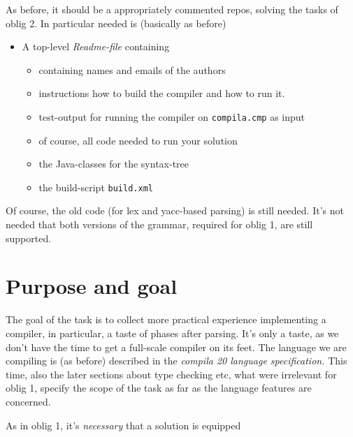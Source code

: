 \documentclass[11pt,freeform]{handout}[2014/08/13]
\begin{document}
As before, it should be a appropriately commented repos, solving the tasks
of oblig 2. In particular needed is (basically as before)


\begin{itemize}
\item A top-level \emph{Readme-file} containing
  \begin{itemize}
  \item  containing names and emails of the authors
  \item instructions how to build the compiler and how to run it.
  \item test-output for running the compiler on \texttt{compila.cmp} as
    input
  \item of course, all code needed to run your solution 
    \item the Java-classes for the syntax-tree
    \item the build-script \texttt{build.xml}
    \end{itemize}
  \end{itemize}

Of course, the old code (for lex and yacc-based parsing) is still
needed. It's not needed that both versions of the grammar, required for
oblig 1, are still supported.



\section{Purpose and goal}
\label{sec:x}

The goal of the task is to collect more practical experience implementing a
compiler, in particular, a taste of phases after parsing. It's only a
taste, as we don't have the time to get a full-scale compiler on its
feet. The language we are compiling is (as before) described in the
\emph{compila 20 language specification.} This time, also the later sections
about type checking etc, what were irrelevant for oblig 1, specify the
scope of the task as far as the language features are concerned.


As in oblig 1, it's \emph{necessary} that a solution is equipped
\end{document}
